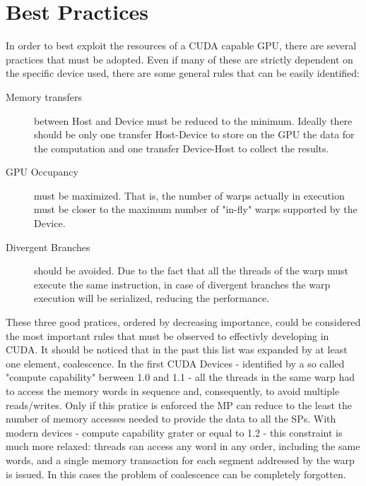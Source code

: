 \section{Best Practices}
In order to best exploit the resources of a CUDA capable GPU, there are several practices that must be adopted. Even if many of these are strictly dependent on the specific device used, there are some general rules that can be easily identified:
\begin{description}
\item[Memory transfers] between Host and Device must be reduced to the minimum. Ideally there should be only one transfer Host-Device to store on the GPU the data for the computation and one transfer Device-Host to collect the results.
\item[GPU Occupancy] must be maximized. That is, the number of warps actually in execution must be closer to the maximum number of "in-fly" warps supported by the Device.
\item[Divergent Branches] should be avoided. Due to the fact that all the threads of the warp must execute the same instruction, in case of divergent branches the warp execution will be serialized, reducing the performance.
\end{description}
These three good pratices, ordered by decreasing importance, could be considered the most important rules that must be observed to effectivly developing in CUDA. It should be noticed that in the past this list was expanded by at least one element, coalescence. In the first CUDA Devices - identified by a so called "compute capability" berween 1.0 and 1.1 - all the threads in the same warp had to access the memory words in sequence and, consequently, to avoid multiple reads/writes. Only if this pratice is enforced the MP can reduce to the least the number of memory accesses needed to provide the data to all the SPs. With modern devices - compute capability grater or equal to 1.2 - this constraint is much more relaxed: threads can access any word in any order, including the same words, and a single memory transaction for each segment addressed by the warp is issued. In this cases the problem of coalescence can be completely forgotten.
